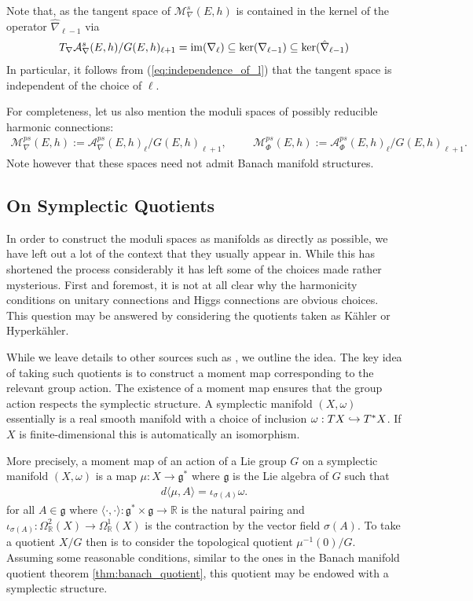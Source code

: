 \documentclass[12pt]{ociamthesis}  %
\begin{document}
Note that, as the tangent space of $\mathcal M^s_\nabla(E,h)$ is
contained in the kernel of the operator $\hat\nabla_{\ell-1}$ via
\begin{align*}
  T_\nabla \mathcal A^s_\nabla(E,h)/G(E,h)_{\ell+1}
  = \operatorname{im}(\nabla_\ell) \subseteq \ker(\nabla_{\ell-1})
  \subseteq \ker(\hat\nabla_{\ell-1})
\end{align*}
In particular, it follows from (\ref{eq:independence_of_l}) that
the tangent space is independent of the choice of $\ell$.

For completeness, let us also mention the moduli spaces of
possibly reducible harmonic connections:
\begin{align*}
  \mathcal M^{ps}_\nabla(E,h) := \mathcal A^{ps}_\nabla(E,h)_\ell/G(E,h)_{\ell + 1}, \hspace{1cm}
  \mathcal M^{ps}_\Phi(E,h) := \mathcal A^{ps}_\Phi(E,h)_\ell/G(E,h)_{\ell + 1}.
\end{align*}
Note however that these spaces need not admit Banach manifold structures.

\subsection{On Symplectic Quotients}\label{sec:symplectic_quotients}

In order to construct the moduli spaces as manifolds as directly as
possible, we have left out a lot of the context that they usually appear
in. While this has shortened the process considerably it has left
some of the choices made rather mysterious. First and foremost, it is
not at all clear why the harmonicity conditions on unitary connections and
Higgs connections are obvious choices. This question may be
answered by considering the quotients taken as K\"ahler or Hyperk\"ahler.

While we leave details to other sources such as \missingcitation,
we outline the idea. The key idea of taking such quotients is to
construct a moment map corresponding to the relevant group action.
The existence of a moment map ensures that the group action respects
the symplectic structure. A symplectic manifold $(X,\omega)$
essentially is a real smooth manifold with a choice of inclusion
$\omega : TX \hookrightarrow T^*X$. If $X$ is finite-dimensional this is
automatically an isomorphism.

More precisely, a moment map of an action of a Lie group $G$ on a symplectic manifold
$(X,\omega)$ is a map $\mu : X \to \mathfrak g^*$
where $\mathfrak g$ is the Lie algebra of $G$ such that
\begin{align*}
  d\langle\mu,A\rangle = \iota_{\sigma(A)}\omega.
\end{align*}
for all $A\in\mathfrak g$ where $\langle \cdot,\cdot\rangle : \mathfrak g^* \times \mathfrak g \to \mathbb R$
is the natural pairing and $\iota_{\sigma(A)} : \Omega^2_{\mathbb R}(X)\to \Omega^1_{\mathbb R}(X)$
is the contraction by the vector field $\sigma(A)$. To take a
quotient $X/G$ then is to consider the topological quotient $\mu^{-1}(0)/G$.
Assuming some reasonable conditions, similar to the ones
in the Banach manifold quotient theorem \ref{thm:banach_quotient},
this quotient may be endowed with a symplectic structure.
\end{document}
